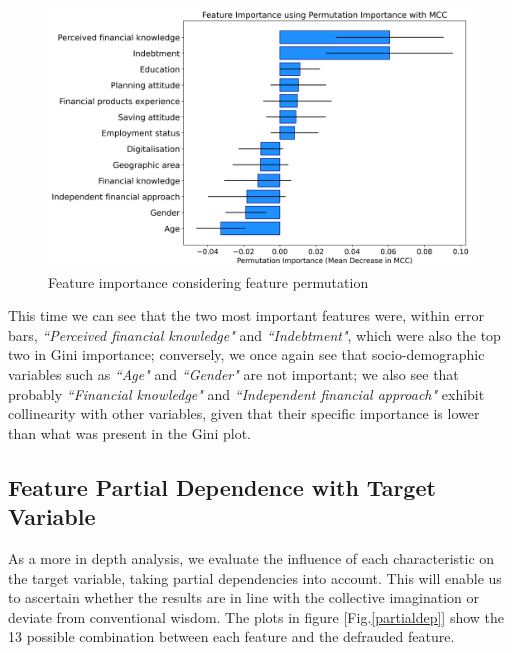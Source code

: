 \documentclass[a4paper,11pt]{article}
\begin{document}
\begin{figure}[H]
  \centering
        \includegraphics[width=14cm]{Permutation_importance.png}
 \caption{Feature importance considering feature permutation}
 \label{permut}
\end{figure}

This time we can see that the two most important features were, within error bars,  \textit{``Perceived financial knowledge"} and \textit{``Indebtment"}, which were also the top two in Gini importance; conversely, we once again see that socio-demographic variables such as \textit{``Age"} and \textit{``Gender"} are not important; we also see that probably \textit{``Financial knowledge"} and \textit{``Independent financial approach"} exhibit collinearity with other variables, given that their specific importance is lower than what was present in the Gini plot. 

\subsection{Feature Partial Dependence with Target Variable}

As a more in depth analysis, we evaluate the influence of each characteristic on the target variable, taking partial dependencies into account. This will enable us to ascertain whether the results are in line with the collective imagination or deviate from conventional wisdom. The plots in figure [Fig.\ref{partialdep}] show the 13 possible combination between each feature and the defrauded feature.
\end{document}
